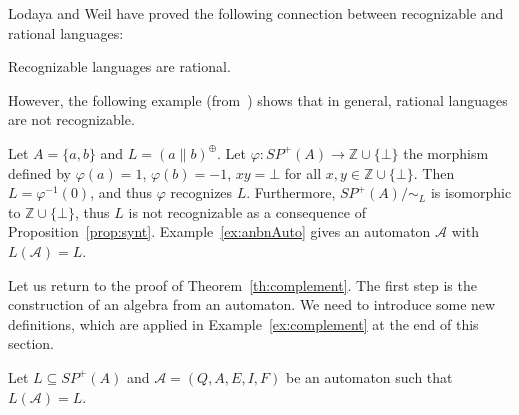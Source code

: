 \documentclass{CSML}
\begin{document}
Lodaya and Weil have proved the following connection between recognizable and rational languages:
\begin{thm}
  \label{th:RecRat}
  Recognizable languages are rational.
\end{thm}

However, the following example (from~\cite{lodaya98kleene}) shows that in general, rational languages are not recognizable.
\begin{exa}
  \label{ex:anbnAlgebra}
  Let $A=\{a,b\}$ and $L=(a\parallel b)^\oplus$.
  Let $\varphi:SP^+(A)\to\mathbb{Z}\cup\{\bot\}$ the morphism defined by $\varphi(a)=1$, $\varphi(b)=-1$, $xy=\bot$ for all $x,y\in \mathbb{Z}\cup\{\bot\}$.
  Then $L=\varphi^{-1}(0)$, and thus $\varphi$ recognizes $L$.
  Furthermore, $SP^+(A)/\mathord{\sim_L}$ is isomorphic to $\mathbb{Z}\cup\{\bot\}$, thus $L$ is not recognizable as a consequence of Proposition~\ref{prop:synt}.
  Example~\ref{ex:anbnAuto} gives an automaton $\mathcal{A}$ with $L(\mathcal{A})=L$.
\end{exa}

\medskip

Let us return to the proof of Theorem~\ref{th:complement}.
The first step is the construction of an algebra from an automaton.
We need to introduce some new definitions, which are applied in Example~\ref{ex:complement} at the end of this section.

\medskip

Let $L\subseteq SP^+(A)$ and $\mathcal{A}=(Q,A,E,I,F)$ be an automaton such that $L(\mathcal{A})=L$.
\end{document}
